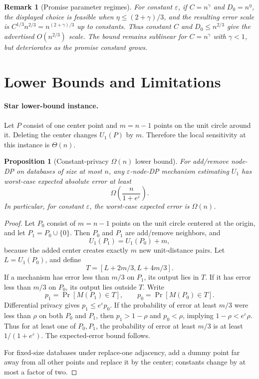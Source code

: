 \documentclass[11pt]{article}
\newtheorem{proposition}[theorem]{Proposition}
\newtheorem{remark}[theorem]{Remark}
\newcommand{\eps}{\varepsilon}
\begin{document}
\begin{remark}[Promise parameter regimes]
For constant \(\eps\), if \(C=n^\gamma\) and \(D_0=n^\eta\), the displayed choice is feasible when \(\eta\le (2+\gamma)/3\), and the resulting error scale is \(C^{1/3}n^{2/3}=n^{(2+\gamma)/3}\) up to constants. Thus constant \(C\) and \(D_0\le n^{2/3}\) give the advertised \(O(n^{2/3})\) scale. The bound remains sublinear for \(C=n^{\gamma}\) with \(\gamma<1\), but deteriorates as the promise constant grows.
\end{remark}

\section{Lower Bounds and Limitations}
\label{sec:lower}

\paragraph{Star lower-bound instance.}
Let \(P\) consist of one center point and \(m=n-1\) points on the unit circle around it. Deleting the center changes \(U_1(P)\) by \(m\). Therefore the local sensitivity at this instance is \(\Theta(n)\).

\begin{proposition}[Constant-privacy \(\Omega(n)\) lower bound]
\label{prop:lower}
For add/remove node-DP on databases of size at most \(n\), any \(\eps\)-node-DP mechanism estimating \(U_1\) has worst-case expected absolute error at least
\[
\Omega\!\left(\frac{n}{1+e^\eps}\right).
\]
In particular, for constant \(\eps\), the worst-case expected error is \(\Omega(n)\).
\end{proposition}

\begin{proof}
Let \(P_0\) consist of \(m=n-1\) points on the unit circle centered at the origin, and let \(P_1=P_0\cup\{0\}\). Then \(P_0\) and \(P_1\) are add/remove neighbors, and
\[
U_1(P_1)=U_1(P_0)+m,
\]
because the added center creates exactly \(m\) new unit-distance pairs. Let \(L=U_1(P_0)\), and define
\[
T=[L+2m/3,L+4m/3].
\]
If a mechanism has error less than \(m/3\) on \(P_1\), its output lies in \(T\). If it has error less than \(m/3\) on \(P_0\), its output lies outside \(T\). Write
\[
p_1=\Pr[M(P_1)\in T],\qquad p_0=\Pr[M(P_0)\in T].
\]
Differential privacy gives \(p_1\le e^\eps p_0\). If the probability of error at least \(m/3\) were less than \(\rho\) on both \(P_0\) and \(P_1\), then \(p_1>1-\rho\) and \(p_0<\rho\), implying \(1-\rho<e^\eps\rho\). Thus for at least one of \(P_0,P_1\), the probability of error at least \(m/3\) is at least \(1/(1+e^\eps)\). The expected-error bound follows.

For fixed-size databases under replace-one adjacency, add a dummy point far away from all other points and replace it by the center; constants change by at most a factor of two.
\end{proof}
\end{document}
